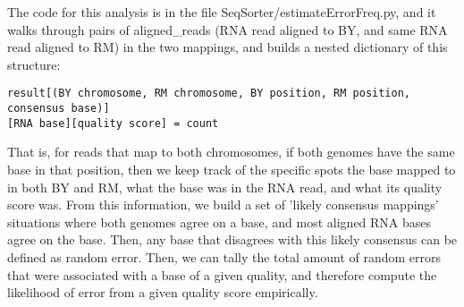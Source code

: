 \documentclass[11pt]{article}
\begin{document}
The code for this analysis is in the file SeqSorter/estimateErrorFreq.py, and it walks through pairs of aligned\_reads (RNA read aligned to BY, and same RNA read aligned to RM) in the two mappings, and builds a nested dictionary of this structure:
\begin{verbatim}
result[(BY chromosome, RM chromosome, BY position, RM position, consensus base)]
[RNA base][quality score] = count
\end{verbatim}
That is, for reads that map to both chromosomes, if both genomes have the same base in that position, then we keep track of the specific spots the base mapped to in both BY and RM, what the base was in the RNA read, and what its quality score was. From this information, we build a set of 'likely consensus mappings' situations where both genomes agree on a base, and most aligned RNA bases agree on the base. Then, any base that disagrees with this likely consensus can be defined as random error. Then, we can tally the total amount of random errors that were associated with a base of a given quality, and therefore compute the likelihood of error from a given quality score empirically.
\end{document}
